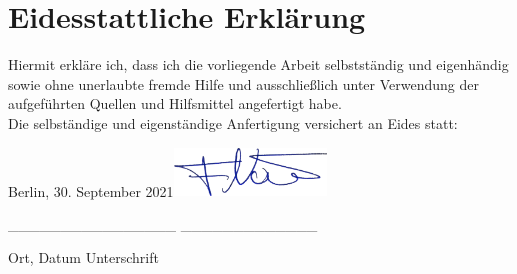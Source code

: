 \thispagestyle{empty}
\section*{Eidesstattliche Erklärung}
Hiermit erkläre ich, dass ich die vorliegende Arbeit selbstständig und eigenhändig sowie ohne unerlaubte fremde Hilfe und ausschließlich unter Verwendung der aufgeführten Quellen und Hilfsmittel angefertigt habe.\\

\noindent Die selbständige und eigenständige Anfertigung versichert an Eides statt:

\vspace{3cm}

%
%


\noindent\hspace{1,05cm} Berlin, 30. September 2021\hfill\includegraphics[width=115pt]{../images/signature/signature.png} \hspace{1cm}
\vspace{-0,6cm}

\noindent\hspace{1cm} \_\_\_\_\_\_\_\_\_\_\_\_\_\_\_\_ \hfill \_\_\_\_\_\_\_\_\_\_\_\_\_ \hspace{1cm}
\vspace{-0,1cm}

\noindent\hspace{2,4cm} Ort, Datum \hfill Unterschrift \hspace{2cm}

